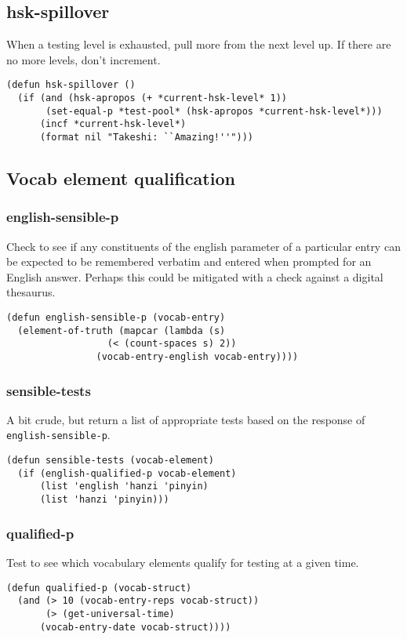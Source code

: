 \documentclass[11pt]{article}
\begin{document}
\subsection{hsk-spillover}
\label{sec-8-6}
When a testing level is exhausted, pull more from the next level up.
If there are no more levels, don't increment.
\begin{verbatim}
(defun hsk-spillover ()
  (if (and (hsk-apropos (+ *current-hsk-level* 1))
	   (set-equal-p *test-pool* (hsk-apropos *current-hsk-level*)))
      (incf *current-hsk-level*)
      (format nil "Takeshi: ``Amazing!''")))
\end{verbatim}
\subsection{Vocab element qualification}
\label{sec-8-7}
\subsubsection*{english-sensible-p}
\label{sec-8-7-1}
Check to see if any constituents of the english parameter of a particular entry
can be expected to be remembered verbatim and entered when prompted for an
English answer. Perhaps this could be mitigated with a check against a digital
thesaurus.
\begin{verbatim}
(defun english-sensible-p (vocab-entry)
  (element-of-truth (mapcar (lambda (s)
			      (< (count-spaces s) 2))
			    (vocab-entry-english vocab-entry))))
\end{verbatim}
\subsubsection*{sensible-tests}
\label{sec-8-7-2}
A bit crude, but return a list of appropriate tests based on the response of
\texttt{english-sensible-p}.
\begin{verbatim}
(defun sensible-tests (vocab-element)
  (if (english-qualified-p vocab-element)
      (list 'english 'hanzi 'pinyin)
      (list 'hanzi 'pinyin)))
\end{verbatim}
\subsubsection*{qualified-p}
\label{sec-8-7-3}
Test to see which vocabulary elements qualify for testing at a given time.
\begin{verbatim}
(defun qualified-p (vocab-struct)
  (and (> 10 (vocab-entry-reps vocab-struct))
       (> (get-universal-time)
	  (vocab-entry-date vocab-struct))))
\end{verbatim}
\end{document}

